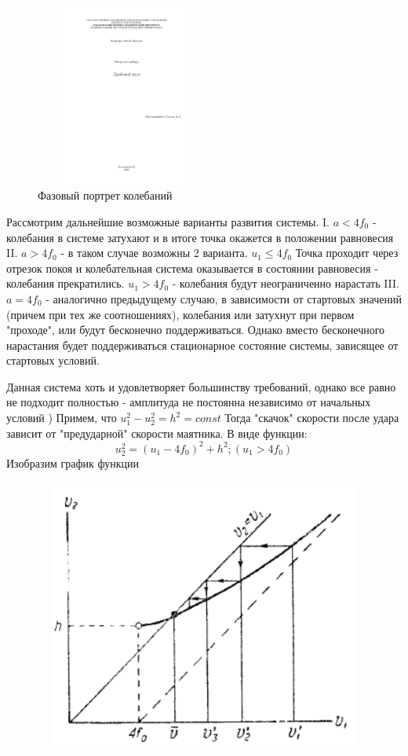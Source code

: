 \documentclass[12pt,a4paper]{article}
\begin{document}
\begin{figure}[H]
\centering
\includegraphics[width=6cm, height=6cm]{ВПВ_3}
\caption{Фазовый портрет колебаний}
\label{pic:1}
\end{figure}
\par Рассмотрим дальнейшие возможные варианты развития системы. \hfill \break
I. $a < 4f_{0}$ - колебания в системе затухают и в итоге точка окажется в положении равновесия
II. $a > 4f_{0}$ - в таком случае возможны 2 варианта.\hfill \break
$u_{1} \leqslant 4f_{0}$ Точка проходит через отрезок покоя и колебательная система оказывается в состоянии равновесия - колебания прекратились. \hfill \break
$u_{1} > 4f_{0}$ - колебания будут неограниченно нарастать \hfill \break
III. $a = 4f_{0}$ - аналогично предыдущему случаю, в зависимости от стартовых значений (причем при тех же соотношениях), колебания или затухнут при первом "проходе", или будут бесконечно поддерживаться. Однако вместо бесконечного нарастания будет поддерживаться стационарное состояние системы, зависящее от стартовых условий.
\par Данная система хоть и удовлетворяет большинству требований, однако все равно не подходит полностью - амплитуда не постоянна независимо от начальных условий \hfill {}) Примем, что $u^{2}_{1}-u^{2}_{2}=h^{2}=const$ \hfill \break
Тогда "скачок" скорости после удара зависит от "предударной" скорости маятника. В виде функции:
\begin{equation}
u^{2}_{2} = (u_{1} - 4f_{0})^{2} + h^{2}; (u_{1} > 4f_{0})
\end{equation}
Изобразим график функции 
\begin{figure}[H]
\centering
\includegraphics[width=12cm, height=9cm]{ВПВ_4}
\caption{}
\label{pic:1}
\end{figure}
\end{document}
